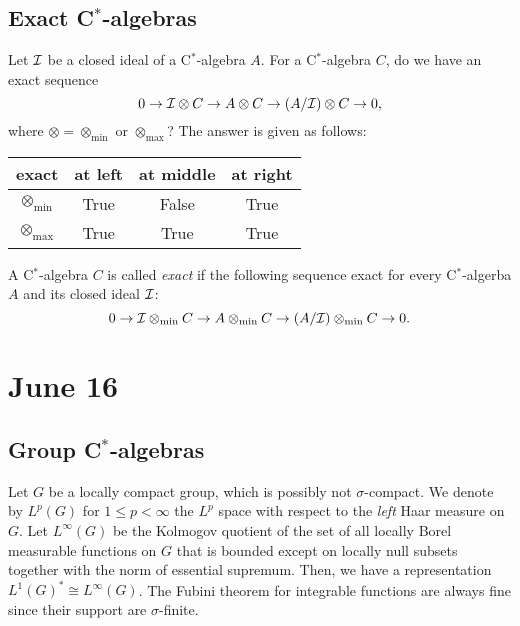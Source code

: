 \documentclass{../../../small}
\begin{document}
\subsection{Exact C$^*$-algebras}


Let $\mathcal{I}$ be a closed ideal of a C$^*$-algebra $A$.
For a C$^*$-algebra $C$, do we have an exact sequence
\[0\to\mathcal{I}\otimes C\to A\otimes C\to(A/\mathcal{I})\otimes C\to0,\]
where $\otimes=\otimes_{\min}$ or $\otimes_{\max}$?
The answer is given as follows:
\begin{center}
\begin{tabular}{c|ccc}
exact&at left&at middle&at right\\\hline
$\otimes_{\min}$&True&False&True\\
$\otimes_{\max}$&True&True&True
\end{tabular}
\end{center}

\begin{defn}
A C$^*$-algebra $ C$ is called \emph{exact} if the following sequence exact for every C$^*$-algerba $A$ and its closed ideal $\mathcal{I}$:
\[0\to\mathcal{I}\otimes_{\min} C\to A\otimes_{\min} C\to(A/\mathcal{I})\otimes_{\min} C\to0.\]
\end{defn}

\iffalse
\[(A/\cI)\otimes_\alpha B\xrightarrow{\sim}\frac{ A\otimes_{\max} B}{\cI\otimes_{\max} B}\to(A/\cI)\otimes_{\max} B.\]
\fi











\newpage
\section{June 16}

\subsection{Group C$^*$-algebras}

Let $G$ be a locally compact group, which is possibly not $\sigma$-compact.
We denote by $L^p(G)$ for $1\le p<\infty$ the $L^p$ space with respect to the \emph{left} Haar measure on $G$.
Let $L^\infty(G)$ be the Kolmogov quotient of the set of all locally Borel measurable functions on $G$ that is bounded except on locally null subsets together with the norm of essential supremum.
Then, we have a representation $L^1(G)^*\cong L^\infty(G)$.
The Fubini theorem for integrable functions are always fine since their support are $\sigma$-finite.
\end{document}
